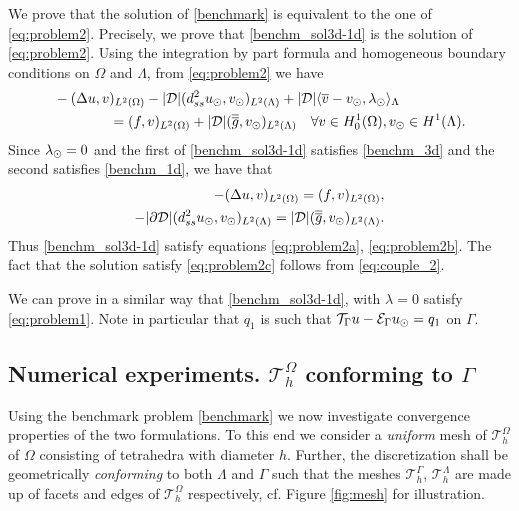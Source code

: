 \documentclass[r]{siamart171218}
\newcommand{\paolo}[1]{{\color{black}#1}}
\begin{document}
\paolo{We prove that the solution of \eqref{benchmark} is equivalent to the one of \eqref{eq:problem2}.}
Precisely, we prove that \eqref{benchm_sol3d-1d} is the solution of
\eqref{eq:problem2}. Using the integration by part formula and homogeneous
boundary conditions on $\Omega$ and $\Lambda$, from \eqref{eq:problem2} we have
\begin{align*}
&-(\Delta u, v)_{L^2(\Omega)} - |{\cal D}|(d^2_{ss} \ud, \vd)_{L^2(\Lambda)} 
+ |{\cal D}|\langle \avrc{v}  - \vd, \ld \rangle_\Lambda
\\
\nonumber
&\qquad\qquad= (f,v)_{L^2(\Omega)} + |{\cal D}| (\avrd{g},\vd)_{L^2(\Lambda)}
\quad \forall v \in H^1_0(\Omega), \vd \in H^1(\Lambda).
\end{align*}
Since $\lambda_{\odot}=0$ and the first of \eqref{benchm_sol3d-1d} satisfies \eqref{benchm_3d} and the second satisfies \eqref{benchm_1d}, we have that
\begin{align*}
-(\Delta u, v)_{L^2(\Omega)} =  (f,v)_{L^2(\Omega)}, 
\\
-|{\partial \cal D}|(d^2_{ss} \ud, \vd)_{L^2(\Lambda)}  = |{\cal D}| (\avrd{g},\vd)_{L^2(\Lambda)}.
\end{align*}
Thus \eqref{benchm_sol3d-1d} satisfy equations \eqref{eq:problem2a}, \eqref{eq:problem2b}.
The fact that the solution satisfy \eqref{eq:problem2c} follows from \eqref{eq:couple_2}.

We can prove in a similar way that \eqref{benchm_sol3d-1d}, with $\lambda=0$
satisfy \eqref{eq:problem1}. Note in particular that $q_1$ is such that
${\mathcal{T}_\Gamma}{u} - \mathcal{E}_\Gamma{u_{\odot}} = q_1$ on $\Gamma$.

\subsection{Numerical experiments. $\mathcal{T}^{\Omega}_h$ conforming to $\Gamma$}\label{sec:experiment_conform}
Using the benchmark problem \eqref{benchmark} we now investigate convergence
properties of the two formulations. To this end we consider a \emph{uniform} mesh
of $\mathcal{T}^{\Omega}_h$ of $\Omega$ consisting of tetrahedra with diameter $h$.
Further, the discretization shall be geometrically \emph{conforming} to both $\Lambda$
and $\Gamma$ such that the meshes $\mathcal{T}^{\Gamma}_h$, $\mathcal{T}^{\Lambda}_h$
are made up of facets and edges of $\mathcal{T}^{\Omega}_h$ respectively, cf. Figure \ref{fig:mesh}
for illustration.
\end{document}
